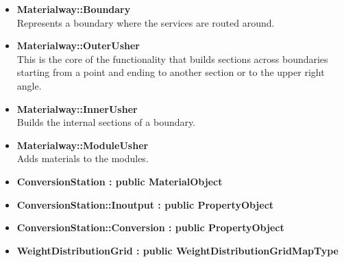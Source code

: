 \documentclass[12pt, a4paper]{article}
\begin{document}
\begin{itemize}
\item \textbf{Materialway::Boundary}\\
Represents a boundary where the services are routed around.

\item \textbf{Materialway::OuterUsher}\\
This is the core of the functionality that builds sections across boundaries starting from a point and ending to another section or to the upper right angle.

\item \textbf{Materialway::InnerUsher}\\
Builds the internal sections of a boundary.

\item \textbf{Materialway::ModuleUsher}\\
Adds materials to the modules.

\item \textbf{ConversionStation : public MaterialObject}
\item \textbf{ConversionStation::Inoutput : public PropertyObject}
\item \textbf{ConversionStation::Conversion : public PropertyObject}
\item \textbf{WeightDistributionGrid : public WeightDistributionGridMapType}

\end{itemize}
\end{document}
